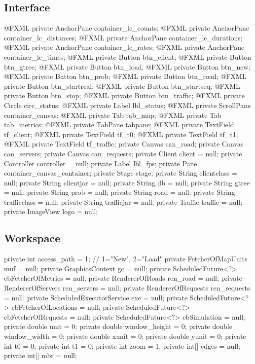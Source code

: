 \subsection{Interface}
\nwenddocs{}\plusendmoddef
@FXML private AnchorPane container_lc_counts;
@FXML private AnchorPane container_lc_distances;
@FXML private AnchorPane container_lc_durations;
@FXML private AnchorPane container_lc_rates;
@FXML private AnchorPane container_lc_times;
@FXML private Button btn_client;
@FXML private Button btn_gtree;
@FXML private Button btn_load;
@FXML private Button btn_new;
@FXML private Button btn_prob;
@FXML private Button btn_road;
@FXML private Button btn_startreal;
@FXML private Button btn_startseq;
@FXML private Button btn_stop;
@FXML private Button btn_traffic;
@FXML private Circle circ_status;
@FXML private Label lbl_status;
@FXML private ScrollPane container_canvas;
@FXML private Tab tab_map;
@FXML private Tab tab_metrics;
@FXML private TabPane tabpane;
@FXML private TextField tf_client;
@FXML private TextField tf_t0;
@FXML private TextField tf_t1;
@FXML private TextField tf_traffic;
private Canvas can_road;
private Canvas can_servers;
private Canvas can_requests;
private Client client = null;
private Controller controller = null;
private Label lbl_fps;
private Pane container_canvas_container;
private Stage stage;
private String clientclass = null;
private String clientjar = null;
private String db = null;
private String gtree = null;
private String prob = null;
private String road = null;
private String trafficclass = null;
private String trafficjar = null;
private Traffic traffic = null;
private ImageView logo = null;
\nwendcode{}\nwdocspar

\subsection{Workspace}
\nwenddocs{}\plusendmoddef
private int access_path = 1;  // 1="New", 2="Load"
private FetcherOfMapUnits muf = null;
private GraphicsContext gc = null;
private ScheduledFuture<?> cbFetcherOfMetrics = null;
private RendererOfRoads ren_road = null;
private RendererOfServers ren_servers = null;
private RendererOfRequests ren_requests = null;
private ScheduledExecutorService exe = null;
private ScheduledFuture<?> cbFetcherOfLocations = null;
private ScheduledFuture<?> cbFetcherOfRequests = null;
private ScheduledFuture<?> cbSimulation = null;
private double unit = 0;
private double window_height = 0;
private double window_width = 0;
private double xunit = 0;
private double yunit = 0;
private int t0 = 0;
private int t1 = 0;
private int zoom = 1;
private int[] edges = null;
private int[] mbr = null;
\nwendcode{}\nwdocspar

